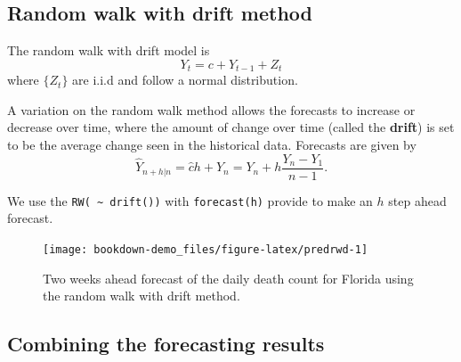 \documentclass[]{book}
\newenvironment{Shaded}{\begin{snugshade}}{\end{snugshade}}
\newcommand{\KeywordTok}[1]{\textcolor[rgb]{0.13,0.29,0.53}{\textbf{#1}}}
\newcommand{\DataTypeTok}[1]{\textcolor[rgb]{0.13,0.29,0.53}{#1}}
\newcommand{\DecValTok}[1]{\textcolor[rgb]{0.00,0.00,0.81}{#1}}
\newcommand{\StringTok}[1]{\textcolor[rgb]{0.31,0.60,0.02}{#1}}
\newcommand{\OperatorTok}[1]{\textcolor[rgb]{0.81,0.36,0.00}{\textbf{#1}}}
\newcommand{\NormalTok}[1]{#1}
\begin{document}
\subsection{Random walk with drift
method}\label{random-walk-with-drift-method}

The random walk with drift model is \[
Y_t=c+Y_{t-1}+Z_t
\] where \(\{Z_t\}\) are i.i.d and follow a normal distribution.

A variation on the random walk method allows the forecasts to increase
or decrease over time, where the amount of change over time (called the
\textbf{drift}) is set to be the average change seen in the historical
data. Forecasts are given by \[
\hat{Y}_{n+h|n}=\hat{c}h+Y_n=Y_n+h\frac{Y_n-Y_1}{n-1}.
\]

We use the \texttt{RW(\ \textasciitilde{}\ drift())} with
\texttt{forecast(h)} provide to make an \(h\) step ahead forecast.

\begin{Shaded}
\end{Shaded}

\begin{figure}

{\centering \texttt{[image: bookdown-demo\_files/figure-latex/predrwd-1]} 

}

\caption{Two weeks ahead forecast of the daily death count for Florida using the random walk with drift method.}\label{fig:predrwd}
\end{figure}

\subsection{Combining the forecasting
results}\label{combining-the-forecasting-results}
\end{document}
